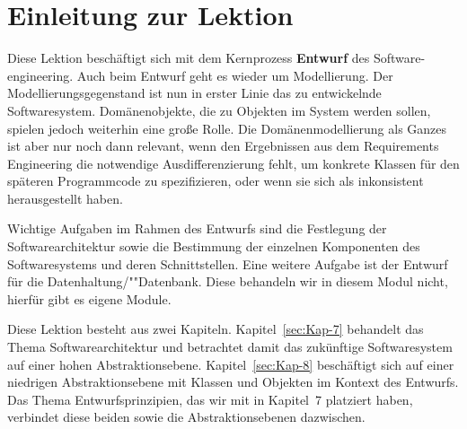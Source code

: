 \cleardoublepage
\chapter*{Einleitung zur Lektion}

Diese Lektion beschäftigt sich mit dem Kernprozess \textbf{Entwurf} des Software-
\linebreak %
engineering. Auch beim Entwurf geht es wieder um Modellierung. Der Modellierungs\-gegenstand ist nun in erster Linie das zu entwickelnde Softwaresystem. Domänen\-objekte, die zu Objekten im System werden sollen, spielen jedoch weiterhin eine große Rolle. Die Domänenmodellierung als Ganzes ist aber nur noch dann relevant, wenn den Ergebnissen aus dem Requirements Engineering die notwendige Ausdifferenzierung fehlt, um konkrete Klassen für den späteren Programmcode zu spezifizieren, oder wenn sie sich als inkonsistent herausgestellt haben. 

Wichtige Aufgaben im Rahmen des Entwurfs sind die Festlegung der Software\-architektur sowie die Bestimmung der einzelnen Komponenten des Software\-systems und deren Schnittstellen. Eine weitere Aufgabe ist der Entwurf für die Daten\-haltung/""Datenbank. Diese behandeln wir in diesem Modul nicht, hierfür gibt es eigene \mbox{Module}. 

Diese Lektion besteht aus zwei Kapiteln. Kapitel~\ref{sec:Kap-7} behandelt das Thema Software\-architektur und betrachtet damit das zukünftige Softwaresystem auf einer hohen Abstraktions\-ebene. Kapitel~\ref{sec:Kap-8} beschäftigt sich auf einer niedrigen Abstraktions\-ebene mit Klassen und Objekten im Kontext des Entwurfs. Das Thema Entwurfs\-prinzipien, das wir mit in Kapitel~7 platziert haben, verbindet diese beiden sowie die Abstraktionsebenen dazwischen.

\clearpage

